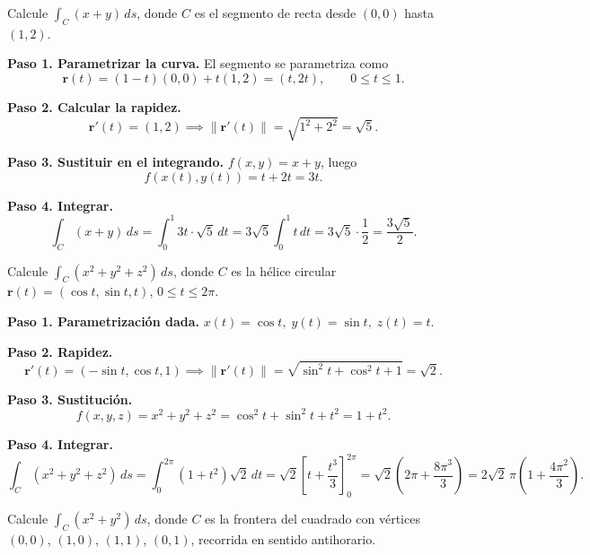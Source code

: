 \begin{example}
Calcule \(\displaystyle \int_C (x + y)\,ds\), donde \(C\) es el
segmento de recta desde \((0,0)\) hasta \((1,2)\).
\end{example}

\begin{myproof}
\textbf{Paso 1. Parametrizar la curva.}
El segmento se parametriza como
\[
\mathbf{r}(t) = (1-t)(0,0) + t(1,2) = (t, 2t), \qquad 0 \le t \le 1.
\]

\textbf{Paso 2. Calcular la rapidez.}
\[
\mathbf{r}'(t) = (1, 2) \implies
\|\mathbf{r}'(t)\| = \sqrt{1^2 + 2^2} = \sqrt{5}.
\]

\textbf{Paso 3. Sustituir en el integrando.}
\(f(x,y) = x + y\), luego
\[
f(x(t), y(t)) = t + 2t = 3t.
\]

\textbf{Paso 4. Integrar.}
\[
\int_C (x+y)\,ds =
\int_0^1 3t \cdot \sqrt{5}\,dt =
3\sqrt{5} \int_0^1 t\,dt =
3\sqrt{5} \cdot \frac{1}{2}
= \boxed{\frac{3\sqrt{5}}{2}}.
\]
\end{myproof}

\begin{example}
Calcule \(\displaystyle \int_C (x^2 + y^2 + z^2)\,ds\), donde \(C\) es
la hélice circular \(\mathbf{r}(t) = (\cos t, \sin t, t)\),
\(0 \le t \le 2\pi\).
\end{example}

\begin{myproof}
\textbf{Paso 1. Parametrización dada.}
\(x(t) = \cos t,\; y(t) = \sin t,\; z(t) = t\).

\textbf{Paso 2. Rapidez.}
\[
\mathbf{r}'(t) = (-\sin t, \cos t, 1) \implies
\|\mathbf{r}'(t)\| = \sqrt{\sin^2 t + \cos^2 t + 1} = \sqrt{2}.
\]

\textbf{Paso 3. Sustitución.}
\[
f(x,y,z) = x^2 + y^2 + z^2 = \cos^2 t + \sin^2 t + t^2 = 1 + t^2.
\]

\textbf{Paso 4. Integrar.}
\[
\int_C (x^2 + y^2 + z^2)\,ds =
\int_0^{2\pi} (1 + t^2)\sqrt{2}\,dt =
\sqrt{2} \left[ t + \frac{t^3}{3} \right]_0^{2\pi}
= \sqrt{2} \left( 2\pi + \frac{8\pi^3}{3} \right)
= \boxed{2\sqrt{2}\,\pi \left(1 + \frac{4\pi^2}{3}\right)}.
\]
\end{myproof}

\begin{example}
Calcule \(\displaystyle \int_C (x^2 + y^2)\,ds\), donde \(C\) es la
frontera del cuadrado con vértices \((0,0)\), \((1,0)\), \((1,1)\),
\((0,1)\), recorrida en sentido antihorario.
\end{example}

